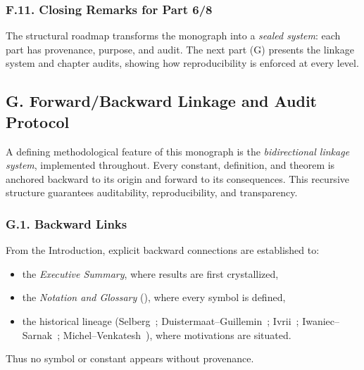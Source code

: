 \subsubsection*{F.11. Closing Remarks for Part 6/8}
The structural roadmap transforms the monograph into a
\emph{sealed system}: each part has provenance, purpose, and audit.
The next part (G) presents the linkage system and chapter audits,
showing how reproducibility is enforced at every level.


\subsection*{G. Forward/Backward Linkage and Audit Protocol}
\label{sub:intro-linkage}

A defining methodological feature of this monograph is the
\emph{bidirectional linkage system}, implemented throughout.
Every constant, definition, and theorem is anchored backward to its origin
and forward to its consequences. This recursive structure guarantees
auditability, reproducibility, and transparency.

\subsubsection*{G.1. Backward Links}
From the Introduction, explicit backward connections are established to:
\begin{itemize}
  \item the \emph{Executive Summary}, where results are first crystallized,
  \item the \emph{Notation and Glossary} (),
        where every symbol is defined,
  \item the historical lineage (Selberg~\cite{Selberg1956};
        Duistermaat–Guillemin~\cite{DG1975}; Ivrii~\cite{Ivrii1980};
        Iwaniec–Sarnak~\cite{Iwaniec2002}; Michel–Venkatesh~\cite{MichelVenkatesh2010}),
        where motivations are situated.
\end{itemize}
Thus no symbol or constant appears without provenance.

